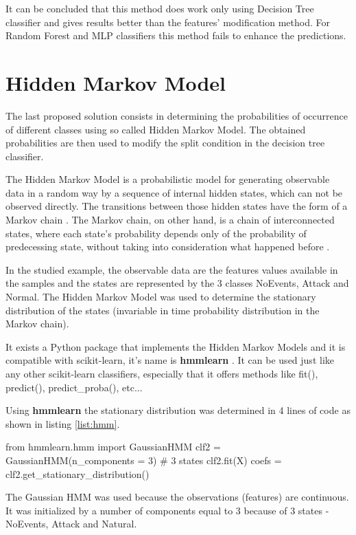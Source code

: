 It can be concluded that this method does work only using Decision Tree classifier and gives results better than the features' modification method. For Random Forest and MLP classifiers this method fails to enhance the predictions.

\section{Hidden Markov Model}
The last proposed solution consists in determining the probabilities of occurrence of different classes using so called Hidden Markov Model. The obtained probabilities are then used to modify the split condition in the decision tree classifier. 

The Hidden Markov Model is a probabilistic model for generating observable data in a random way by a sequence of internal hidden states, which can not be observed directly. The transitions between those hidden states have the form of a Markov chain \cite{noauthor_tutorial_nodate}. The Markov chain, on other hand, is a chain of interconnected states, where each state's probability depends only of the probability of predecessing state, without taking into consideration what happened before \cite{amit_introduction_2019}.

In the studied example, the observable data are the features values available in the samples and the states are represented by the 3 classes NoEvents, Attack and Normal. The Hidden Markov Model was used to determine the stationary distribution of the states (invariable in time probability distribution in the Markov chain).

It exists a Python package that implements the Hidden Markov Models and it is compatible with scikit-learn, it's name is \textbf{hmmlearn} \cite{noauthor_hmmlearn_2020}. It can be used just like any other scikit-learn classifiers, especially that it offers methods like fit(), predict(), predict\_proba(), etc...

Using \textbf{hmmlearn} the stationary distribution was determined in 4 lines of code as shown in listing \ref{list:hmm}.
\begin{python}[caption = {Determination of the stationary distribution of the classes using hmmlearn}, label = list:hmm]
from hmmlearn.hmm import GaussianHMM 
clf2 = GaussianHMM(n_components = 3) # 3 states
clf2.fit(X)
coefs = clf2.get_stationary_distribution()
\end{python}
The Gaussian HMM was used because the observations (features) are continuous. It was initialized by a number of components equal to 3 because of 3 states - NoEvents, Attack and Natural.


